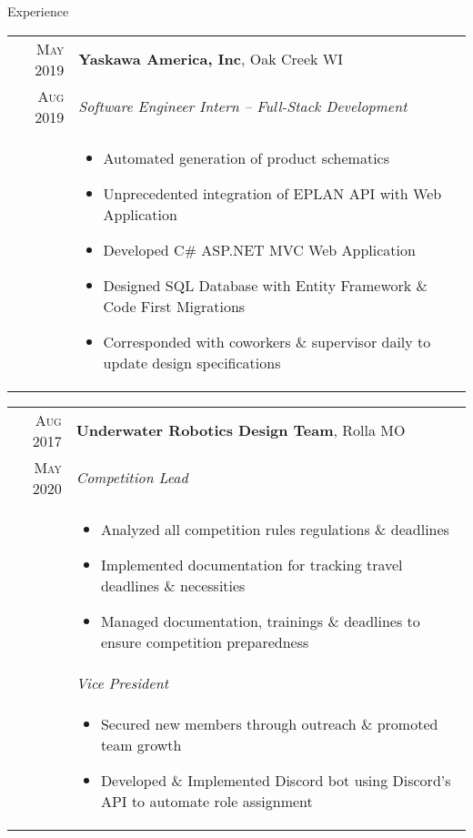 \documentclass{resume}
\begin{document}
\begin{rSection}{Experience}
{  \begin{tabular}{r|p{15cm}}
    \textsc{May 2019} & \textbf{Yaskawa America, Inc}, Oak Creek WI \\
    \textsc{Aug 2019}  & \textit{Software Engineer Intern – Full-Stack Development} \\ &
    \begin{itemize}
        \item {Automated generation of product schematics}
        \item {Unprecedented integration of EPLAN API with Web Application}
        \item {Developed C\# ASP.NET MVC Web Application}
        \item {Designed SQL Database with Entity Framework \& Code First Migrations}
        \item {Corresponded with coworkers \& supervisor daily to update design specifications}
    \end{itemize}
  \end{tabular}
  
    \begin{tabular}{r|p{15cm}}
      \textsc{Aug 2017} & \textbf{Underwater Robotics Design Team}, Rolla MO \\
      \textsc{May 2020}  & \textit{Competition Lead} \\ &
      \begin{itemize}
          \item {Analyzed all competition rules regulations \& deadlines}
          \item {Implemented documentation for tracking travel deadlines \& necessities}
          \item {Managed documentation, trainings \& deadlines to ensure competition preparedness}
      \end{itemize}\\ &
      \textit{Vice President} \\ &
      \begin{itemize}
          \item {Secured new members through outreach \& promoted team growth}
          \item {Developed \& Implemented Discord bot using Discord's API to automate role assignment}
      \end{itemize}
    \end{tabular}
}
\end{rSection}
\end{document}
